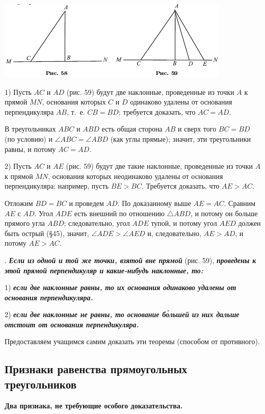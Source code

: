 \documentclass[oneside]{book}
\begin{document}
\includegraphics{pics/ris-58-59}

1) Пусть $AC$ и $AD$ (рис. 59) будут две наклонные, проведенные из точки $A$ к прямой $MN$, основания которых $C$ и $D$ одинаково удалены от основания перпендикуляра $AB$, т.~е. $CB=BD$;
требуется доказать, что $AC = AD$.

В треугольниках $ABC$ и $ABD$ есть общая сторона $AB$ и сверх того $BC=BD$ (по условию) и $\angle ABC = \angle ABD$ (как углы прямые);
значит, эти треугольники равны, и потому $AC = AD$.

2) Пусть $AC$ и $AE$ (рис. 59) будут две такие наклонные, проведенные из точки $A$ к прямой $MN$, основания которых неодинаково удалены от основания перпендикуляра;
например, пусть $BE>BC$.
Требуется доказать, что $AE>AC$.

Отложим $BD=BC$ и проведем $AD$.
По доказанному выше $AE = AC$.
Сравним $AE$ с $AD$.
Угол $ADE$ есть внешний по отношению $\triangle ABD$, и потому он больше прямого угла $ABD$;
следовательно, угол $ADE$ тупой, и потому угол $AED$ должен быть острый (§45), значит, $\angle ADE>\angle AED$ и, следовательно, $AE>AD$, и потому $AE>AC$.

.
\textbf{\emph{Если из одной и той же точки, взятой вне прямой}} (рис. 59), \textbf{\emph{проведены к этой прямой перпендикуляр и какие-нибудь наклонные, то:}}

1) \textbf{\emph{если две наклонные равны, то их основания одинаково удалены от основания перпендикуляра.}}

2) \textbf{\emph{если две наклонные не равны, то основание б\'{о}льшей из них дальше отстоит от основания перпендикуляра.}}

Предоставляем учащимся самим доказать эти теоремы (способом от противного).

\subsection*{Признаки равенства прямоугольных треугольников}

\textbf{Два признака, не требующие особого доказательства.}
\end{document}
